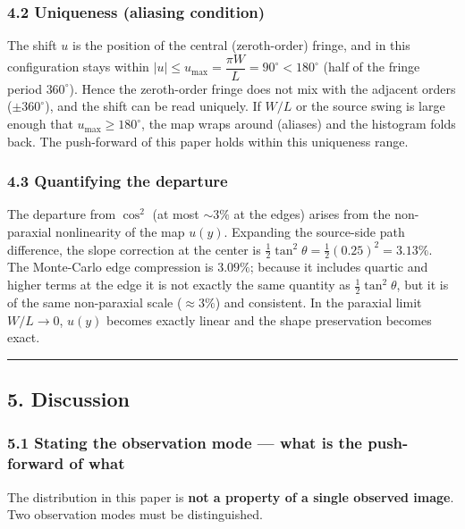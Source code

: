 \documentclass[
]{article}
\begin{document}
\subsubsection{4.2 Uniqueness (aliasing
condition)}\label{uniqueness-aliasing-condition}

The shift \(u\) is the position of the central (zeroth-order) fringe,
and in this configuration stays within
\(|u|\le u_{\max}=\dfrac{\pi W}{L}=90^\circ<180^\circ\) (half of the
fringe period \(360^\circ\)). Hence the zeroth-order fringe does not mix
with the adjacent orders (\(\pm360^\circ\)), and the shift can be read
uniquely. If \(W/L\) or the source swing is large enough that
\(u_{\max}\ge180^\circ\), the map wraps around (aliases) and the
histogram folds back. The push-forward of this paper holds within this
uniqueness range.

\subsubsection{4.3 Quantifying the
departure}\label{quantifying-the-departure}

The departure from \(\cos^2\) (at most \(\sim3\%\) at the edges) arises
from the non-paraxial nonlinearity of the map \(u(y)\). Expanding the
source-side path difference, the slope correction at the center is
\(\tfrac12\tan^2\theta=\tfrac12(0.25)^2=3.13\%\). The Monte-Carlo edge
compression is \(3.09\%\); because it includes quartic and higher terms
at the edge it is not exactly the same quantity as
\(\tfrac12\tan^2\theta\), but it is of the same non-paraxial scale
(\(\approx3\%\)) and consistent. In the paraxial limit \(W/L\to0\),
\(u(y)\) becomes exactly linear and the shape preservation becomes
exact.

\begin{center}\rule{0.5\linewidth}{0.5pt}\end{center}

\subsection{5. Discussion}\label{discussion}

\subsubsection{5.1 Stating the observation mode --- what is the
push-forward of
what}\label{stating-the-observation-mode-what-is-the-push-forward-of-what}

The distribution in this paper is \textbf{not a property of a single
observed image}. Two observation modes must be distinguished.
\end{document}
